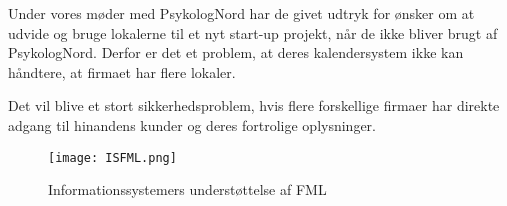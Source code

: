 Under vores møder med PsykologNord har de givet udtryk for ønsker om at udvide og bruge lokalerne til et nyt start-up projekt, når de ikke bliver brugt af PsykologNord.
Derfor er det et problem, at deres kalendersystem ikke kan håndtere, at firmaet har flere lokaler.

Det vil blive et stort sikkerhedsproblem, hvis flere forskellige firmaer har direkte adgang til hinandens kunder og deres fortrolige oplysninger.


\begin{figure}[H]
    \caption{Informationssystemers understøttelse af FML}
    \centering
        \texttt{[image: ISFML.png]}
    \label{forretning:isfml}
\end{figure}


